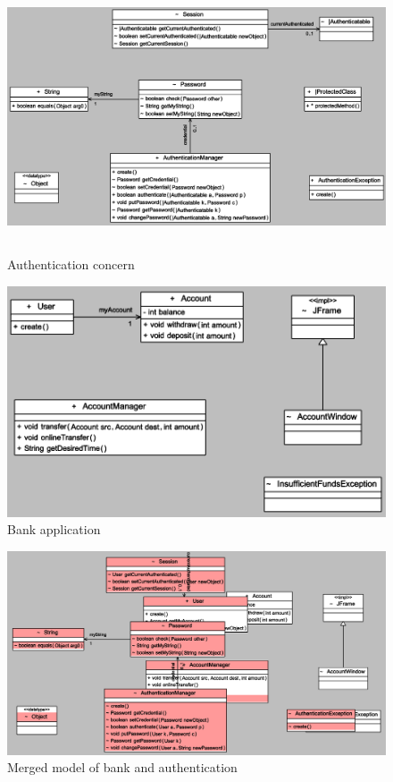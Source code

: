 \begin{figure}
	\includegraphics[width=\linewidth, height = 8cm]{authentication.PNG}
	\caption{Authentication concern}
	\label{fig :Authentication Concern}
\end{figure}
\begin{figure}
	\includegraphics[width=\linewidth]{bank.PNG}
	\caption{Bank application}
	\label{fig :Bank App}
\end{figure}
\begin{figure}
	\centering
    \includegraphics[width=\linewidth]{default_bank.PNG}
    \caption{ Merged model of bank and authentication}
    \label{fig : default bank and authentication}
\end{figure}
